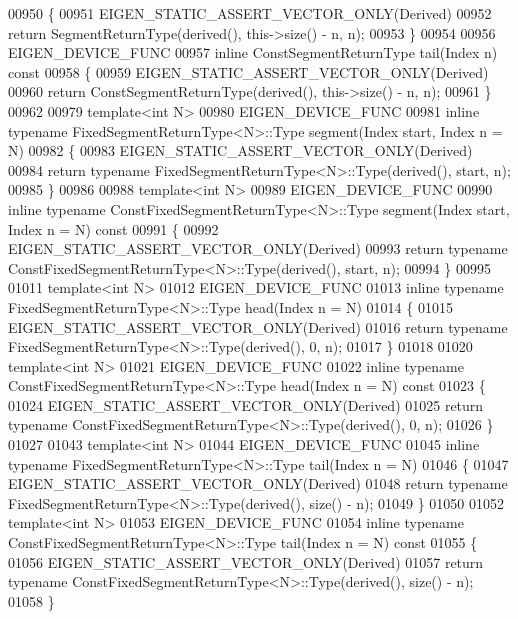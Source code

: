 \begin{DoxyCode}
00950 \{
00951   EIGEN\_STATIC\_ASSERT\_VECTOR\_ONLY(Derived)
00952   \textcolor{keywordflow}{return} SegmentReturnType(derived(), this->size() - n, n);
00953 \}
00954 
00956 EIGEN\_DEVICE\_FUNC
00957 \textcolor{keyword}{inline} ConstSegmentReturnType tail(Index n)\textcolor{keyword}{ const}
00958 \textcolor{keyword}{}\{
00959   EIGEN\_STATIC\_ASSERT\_VECTOR\_ONLY(Derived)
00960   \textcolor{keywordflow}{return} ConstSegmentReturnType(derived(), this->size() - n, n);
00961 \}
00962 
00979 \textcolor{keyword}{template}<\textcolor{keywordtype}{int} N>
00980 EIGEN\_DEVICE\_FUNC
00981 \textcolor{keyword}{inline} \textcolor{keyword}{typename} FixedSegmentReturnType<N>::Type segment(Index start, Index n = N)
00982 \{
00983   EIGEN\_STATIC\_ASSERT\_VECTOR\_ONLY(Derived)
00984   \textcolor{keywordflow}{return} \textcolor{keyword}{typename} FixedSegmentReturnType<N>::Type(derived(), start, n);
00985 \}
00986 
00988 \textcolor{keyword}{template}<\textcolor{keywordtype}{int} N>
00989 EIGEN\_DEVICE\_FUNC
00990 \textcolor{keyword}{inline} \textcolor{keyword}{typename} ConstFixedSegmentReturnType<N>::Type segment(Index start, Index n = N)\textcolor{keyword}{ const}
00991 \textcolor{keyword}{}\{
00992   EIGEN\_STATIC\_ASSERT\_VECTOR\_ONLY(Derived)
00993   \textcolor{keywordflow}{return} \textcolor{keyword}{typename} ConstFixedSegmentReturnType<N>::Type(derived(), start, n);
00994 \}
00995 
01011 \textcolor{keyword}{template}<\textcolor{keywordtype}{int} N>
01012 EIGEN\_DEVICE\_FUNC
01013 \textcolor{keyword}{inline} \textcolor{keyword}{typename} FixedSegmentReturnType<N>::Type head(Index n = N)
01014 \{
01015   EIGEN\_STATIC\_ASSERT\_VECTOR\_ONLY(Derived)
01016   \textcolor{keywordflow}{return} \textcolor{keyword}{typename} FixedSegmentReturnType<N>::Type(derived(), 0, n);
01017 \}
01018 
01020 \textcolor{keyword}{template}<\textcolor{keywordtype}{int} N>
01021 EIGEN\_DEVICE\_FUNC
01022 \textcolor{keyword}{inline} \textcolor{keyword}{typename} ConstFixedSegmentReturnType<N>::Type head(Index n = N)\textcolor{keyword}{ const}
01023 \textcolor{keyword}{}\{
01024   EIGEN\_STATIC\_ASSERT\_VECTOR\_ONLY(Derived)
01025   \textcolor{keywordflow}{return} \textcolor{keyword}{typename} ConstFixedSegmentReturnType<N>::Type(derived(), 0, n);
01026 \}
01027 
01043 \textcolor{keyword}{template}<\textcolor{keywordtype}{int} N>
01044 EIGEN\_DEVICE\_FUNC
01045 \textcolor{keyword}{inline} \textcolor{keyword}{typename} FixedSegmentReturnType<N>::Type tail(Index n = N)
01046 \{
01047   EIGEN\_STATIC\_ASSERT\_VECTOR\_ONLY(Derived)
01048   \textcolor{keywordflow}{return} \textcolor{keyword}{typename} FixedSegmentReturnType<N>::Type(derived(), size() - n);
01049 \}
01050 
01052 \textcolor{keyword}{template}<\textcolor{keywordtype}{int} N>
01053 EIGEN\_DEVICE\_FUNC
01054 \textcolor{keyword}{inline} \textcolor{keyword}{typename} ConstFixedSegmentReturnType<N>::Type tail(Index n = N)\textcolor{keyword}{ const}
01055 \textcolor{keyword}{}\{
01056   EIGEN\_STATIC\_ASSERT\_VECTOR\_ONLY(Derived)
01057   \textcolor{keywordflow}{return} \textcolor{keyword}{typename} ConstFixedSegmentReturnType<N>::Type(derived(), size() - n);
01058 \}
\end{DoxyCode}

